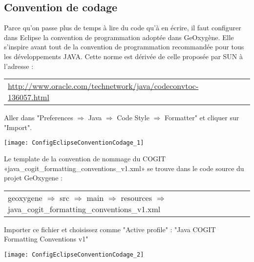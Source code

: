 



\subsection{Convention de codage}

Parce qu'on passe plus de temps à lire du code qu’à en écrire, il faut configurer dans Eclipse la convention de programmation adoptée dans GeOxygène. Elle s'inspire avant tout de la convention de programmation recommandée pour tous les développements JAVA. Cette norme est dérivée de celle proposée par SUN à l’adresse :

\begin{tabular}[!t]{llll}
{\href{http://www.oracle.com/technetwork/java/codeconvtoc-136057.html}{http://www.oracle.com/technetwork/java/codeconvtoc-136057.html}}  
\end{tabular}

\noindent
Aller dans "Preferences $\Rightarrow$ Java $\Rightarrow$ Code Style $\Rightarrow$ Formatter" et cliquer sur "Import". 

\begin{center}
\texttt{[image: ConfigEclipseConventionCodage\_1]}
\end{center}

\noindent
Le template de la convention de nommage du COGIT «java\_cogit\_formatting\_conventions\_v1.xml» se trouve dans le code source du projet GeOxygene :

\begin{tabular}[!t]{llll}
geoxygene $\Rightarrow$  src $\Rightarrow$  main $\Rightarrow$  resources $\Rightarrow$  java\_cogit\_formatting\_conventions\_v1.xml
\end{tabular}

\smallskip

\noindent
Importer ce fichier et choisissez comme "Active profile" : "Java COGIT Formatting Conventions v1" 

\begin{center}
\texttt{[image: ConfigEclipseConventionCodage\_2]}
\end{center}





